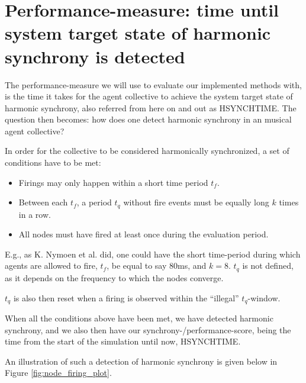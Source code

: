 \section{Performance-measure: time until system target state of harmonic synchrony is detected}
\label{sec:performance_measure}

The performance-measure we will use to evaluate our implemented methods with, is the time it takes for the agent collective to achieve the system target state of harmonic synchrony, also referred from here on and out as HSYNCHTIME. The question then becomes: how does one detect harmonic synchrony in an musical agent collective?

In order for the collective to be considered harmonically synchronized, a set of conditions have to be met:

\begin{itemize}
	\item Firings may only happen within a short time period $t_f$.
	\item Between each $t_f$, a period $t_q$ without fire events must be equally long $k$ times in a row.
	\item All nodes must have fired at least once during the evaluation period.
\end{itemize}

E.g., as K. Nymoen et al. did, one could have the short time-period during which agents are allowed to fire, $t_f$, be equal to say 80ms, and $k=8$. $t_q$ is not defined, as it depends on the frequency to which the nodes converge.

$t_q$ is also then reset when a firing is observed within the ``illegal'' $t_q$-window.

When all the conditions above have been met, we have detected harmonic synchrony, and we also then have our synchrony-/performance-score, being the time from the start of the simulation until now, HSYNCHTIME.

An illustration of such a detection of harmonic synchrony is given below in Figure \ref{fig:node_firing_plot}.

